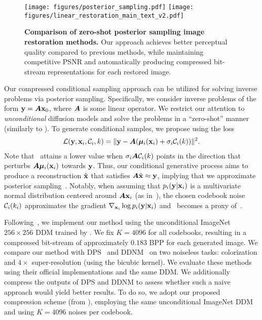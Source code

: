 \begin{figure*}[t]
    \centering
    \texttt{[image: figures/posterior\_sampling.pdf]}
    \texttt{[image: figures/linear\_restoration\_main\_text\_v2.pdf]}
    \caption{\textbf{Comparison of zero-shot posterior sampling image restoration methods.} Our approach achieves better perceptual quality compared to previous methods, while maintaining competitive PSNR and automatically producing compressed bit-stream representations for each restored image.}
    \label{fig:zero-shot-posterior-sampling-qualitative}
\end{figure*}

Our compressed conditional sampling approach can be utilized for solving inverse problems via posterior sampling.
Specifically, we consider inverse problems of the form ${\mathbf{y}}={\bm{A}}{\mathbf{x}}_{0}$, where ${\bm{A}}$ is some linear operator.
We restrict our attention to \emph{unconditional} diffusion models and solve the problems in a ``zero-shot'' manner (similarly to \citet{kawar2022denoising,chung2023diffusion,wang2023zeroshot}). 
To generate conditional samples, we propose using the loss
\begin{align}
{\mathcal{L}}({\mathbf{y}},{\mathbf{x}}_{i},{\mathcal{C}}_{i},k)=\lVert{\mathbf{y}}-{\bm{A}}({\bm{\mu}}_{i}({\mathbf{x}}_{i})+\sigma_{i}{\mathcal{C}}_{i}(k))\rVert^{2}.\label{eq:l_posterior_sampling}
\end{align}
Note that~ attains a lower value when $\sigma_{i}{\bm{A}}{\mathcal{C}}_{i}(k)$ points in the direction that perturbs ${\bm{A}}{\bm{\mu}}_{i}({\mathbf{x}}_{i})$ towards ${\mathbf{y}}$.
Thus, our conditional generative process aims to produce a reconstruction $\hat{{\mathbf{x}}}$ that satisfies ${\bm{A}}\hat{{\mathbf{x}}}\approx{\mathbf{y}}$, implying that we approximate posterior sampling~\citep{pmlr-v202-ohayon23a}.
Notably, when assuming that $p_{i}({\mathbf{y}}|{\mathbf{x}}_{i})$ is a multivariate normal distribution centered around ${\bm{A}}{\mathbf{x}}_{i}$ (as in~\citep{jalal2021posterior}), the chosen codebook noise ${\mathcal{C}}_{i}(k_{i})$ approximates the gradient $\nabla_{{\mathbf{x}}_{i}}\log{p_{i}({\mathbf{y}}|{\mathbf{x}}_{i})}$ and~ becomes a proxy of~.

Following~\citep{chung2023diffusion,wang2023zeroshot}, we implement our method using the unconditional ImageNet $256\times 256$ DDM trained by \citet{dhariwal2021diffusion}.
We fix $K=4096$ for all codebooks, resulting in a compressed bit-stream of approximately $0.183$ BPP for each generated image.
We compare our method with DPS~\citep{chung2023diffusion} and DDNM~\citep{wang2023zeroshot} on two noiseless tasks: colorization and $4\times $ super-resolution (using the bicubic kernel). We evaluate these methods using their official implementations and the same DDM.
We additionally compress the outputs of DPS and DDNM to assess whether such a naive approach would yield better results.
To do so, we adopt our proposed compression scheme (from ), employing the same unconditional ImageNet DDM and using $K=4096$ noises per codebook.


